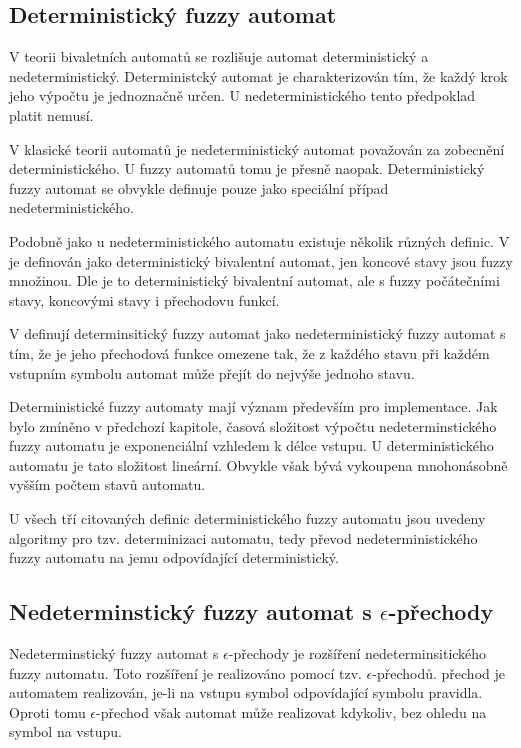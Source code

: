 \documentclass[a4paper,10pt]{article}
\begin{document}
\subsection{Deterministický fuzzy automat}
V teorii  bivaletních automatů se rozlišuje automat deterministický a nedeterministický. Deterministcký automat je charakterizován tím, že každý krok jeho výpočtu je jednoznačně určen. U nedeterministického tento předpoklad platit nemusí. 

V klasické teorii automatů je nedeterministický automat považován za zobecnění deterministického. U fuzzy automatů tomu je přesně naopak. Deterministický fuzzy automat se obvykle definuje pouze jako speciální případ nedeterministického.

Podobně jako u nedeterministického automatu existuje několik různých definic. V \cite{Bel-DetFuzAut} je definován jako deterministický bivalentní automat, jen koncové stavy jsou fuzzy množinou. Dle \cite{LiLiLi-RelAmoSevTypFuzAut} je to deterministický bivalentní automat, ale s fuzzy počátečními stavy, koncovými stavy i přechodovu funkcí.

V \cite{GonGar-FuzzLangInfRanAccGuzzAutPumLemDetProc} definují determinsitický fuzzy automat jako nedeterministický fuzzy automat s tím, že je jeho přechodová funkce omezene tak, že z každého stavu při každém vstupním symbolu automat může přejít do nejvýše jednoho stavu.

Deterministické fuzzy automaty mají význam především pro implementace. Jak bylo zmíněno v předchozí kapitole, časová složitost výpočtu nedeterminstického fuzzy automatu je exponenciální vzhledem k délce vstupu. U deterministického automatu je tato složitost lineární. Obvykle však bývá vykoupena mnohonásobně vyšším počtem stavů automatu.

U všech tří citovaných definic deterministického fuzzy automatu jsou uvedeny algoritmy pro tzv. determinizaci automatu, tedy převod nedeterministického fuzzy automatu na jemu odpovídající deterministický.


\subsection{Nedeterminstický fuzzy automat s $\epsilon$-přechody}
Nedeterminstický fuzzy automat s $\epsilon$-přechody je rozšíření nedeterminsitického fuzzy automatu. Toto rozšíření je realizováno pomocí tzv. $\epsilon$-přechodů.  přechod je automatem realizován, je-li na vstupu symbol odpovídající symbolu pravidla. Oproti tomu $\epsilon$-přechod však automat může realizovat kdykoliv, bez ohledu na symbol na vstupu.
\end{document}
